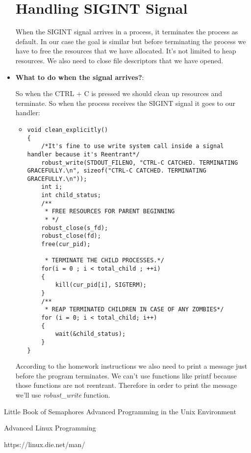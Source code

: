 \documentclass{article}
\begin{document}
\begin{itemize}
 




\newpage

\section{Handling SIGINT Signal}
When the SIGINT signal arrives in a process, it terminates the process as default. In our case the goal is similar but before terminating the process we have to free the resources that we have allocated. It's not limited to heap resources. We also need to close file descriptors that we have opened.
\item \textbf{What to do when the signal arrives?}:

\quad So when the CTRL + C is pressed we should clean up resources and terminate. So when the process receives the SIGINT signal it goes to our handler:

\begin{itemize}
    \item 
    \begin{lstlisting}
void clean_explicitly()
{
    /*It's fine to use write system call inside a signal handler because it's Reentrant*/ 
    robust_write(STDOUT_FILENO, "CTRL-C CATCHED. TERMINATING GRACEFULLY.\n", sizeof("CTRL-C CATCHED. TERMINATING GRACEFULLY.\n"));
    int i;
    int child_status;
    /**
     * FREE RESOURCES FOR PARENT BEGINNING
     * */
    robust_close(s_fd);
    robust_close(fd);
    free(cur_pid);
    
     * TERMINATE THE CHILD PROCESSES.*/
    for(i = 0 ; i < total_child ; ++i)
    {
        kill(cur_pid[i], SIGTERM);
    }
    /**
     * REAP TERMINATED CHILDREN IN CASE OF ANY ZOMBIES*/
    for (i = 0; i < total_child; i++) 
    {
        wait(&child_status);
    }
}
    \end{lstlisting}
\end{itemize}



\quad According to the homework instructions we also need to print a message just before the program terminates. We can't use functions like printf because those functions are not reentrant. Therefore in order to print the message we'll use 
\textit{robust\_write} function.


\end{itemize}






\pagebreak
\begin{thebibliography}{}
Little Book of Semaphores
Advanced Programming in the Unix Environment

\bibitem{} 
Advanced Linux Programming

\bibitem{} 
https://linux.die.net/man/

\end{thebibliography}
\end{document}

